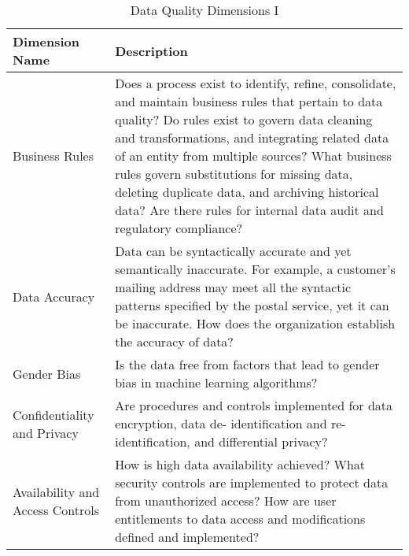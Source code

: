 \begin{table}
\vspace*{-3.5in}
\caption{Data Quality Dimensions I}
\centering
\begin{tabular}{p{4.0cm} p{10cm}}
\toprule
\textbf{Dimension Name} &  \textbf{Description} \\ 
\bottomrule
Business Rules & 
Does a process exist to identify, refine, consolidate, and maintain business
rules that pertain to data quality? Do rules exist to govern data cleaning and
transformations, and integrating related data of an entity from multiple sources?
What business rules govern substitutions for missing data, deleting duplicate data,
and archiving historical data? Are there rules for internal data audit and regulatory
compliance? \\
Data Accuracy & 
Data can be syntactically accurate and yet semantically inaccurate. For example,
a customer's mailing address may meet all the syntactic patterns specified by the
postal service, yet it can be inaccurate. How does the organization establish the
accuracy of data? \\
Gender Bias & 
Is the data free from factors that lead to gender bias in machine learning
algorithms? \\
Confidentiality and Privacy & 
Are procedures and controls implemented for data encryption, data de-
identification and re-identification, and differential privacy? \\
Availability and Access Controls & 
How is high data availability achieved? What security controls are implemented to
protect data from unauthorized access? How are user entitlements to data access
and modifications defined and implemented? \\
\bottomrule
\end{tabular}
\end{table}

